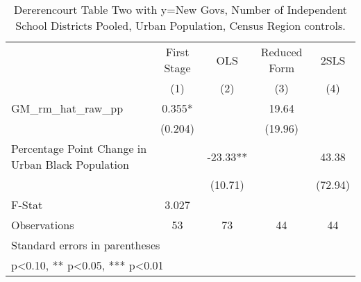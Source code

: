 \begin{table}[htbp]\centering
\def\sym#1{\ifmmode^{#1}\else\(^{#1}\)\fi}
\caption{Dererencourt Table Two with y=New Govs, Number of Independent School Districts  Pooled, Urban Population, Census Region controls.}
\begin{tabular}{l*{4}{c}}
\toprule
                    & First Stage   &         OLS   &Reduced Form   &        2SLS   \\
                    &\multicolumn{1}{c}{(1)}   &\multicolumn{1}{c}{(2)}   &\multicolumn{1}{c}{(3)}   &\multicolumn{1}{c}{(4)}   \\
\midrule
GM\_rm\_hat\_raw\_pp    &       0.355*  &               &       19.64   &               \\
                    &     (0.204)   &               &     (19.96)   &               \\
\addlinespace
Percentage Point Change in Urban Black Population&               &      -23.33** &               &       43.38   \\
                    &               &     (10.71)   &               &     (72.94)   \\
\midrule
F-Stat              &       3.027   &               &               &               \\
Observations        &          53   &          73   &          44   &          44   \\
\bottomrule
\multicolumn{5}{l}{\footnotesize Standard errors in parentheses}\\
\multicolumn{5}{l}{\footnotesize * p<0.10, ** p<0.05, *** p<0.01}\\
\end{tabular}
\end{table}
